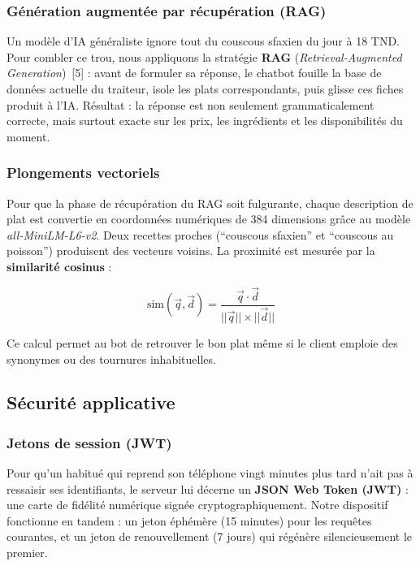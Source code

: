 \subsubsection{Génération augmentée par récupération (RAG)}

Un modèle d'IA généraliste ignore tout du couscous sfaxien du jour à 18 TND. Pour combler ce trou, nous appliquons la stratégie \textbf{RAG} (\textit{Retrieval-Augmented Generation})~[5] : avant de formuler sa réponse, le chatbot fouille la base de données actuelle du traiteur, isole les plats correspondants, puis glisse ces fiches produit à l'IA. Résultat : la réponse est non seulement grammaticalement correcte, mais surtout exacte sur les prix, les ingrédients et les disponibilités du moment.

\subsubsection{Plongements vectoriels}

Pour que la phase de récupération du RAG soit fulgurante, chaque description de plat est convertie en coordonnées numériques de 384 dimensions grâce au modèle \textit{all-MiniLM-L6-v2}. Deux recettes proches (``couscous sfaxien'' et ``couscous au poisson'') produisent des vecteurs voisins. La proximité est mesurée par la \textbf{similarité cosinus} :

\begin{equation}
    \text{sim}(\vec{q}, \vec{d}) = \frac{\vec{q} \cdot \vec{d}}{||\vec{q}|| \times ||\vec{d}||}
\end{equation}

Ce calcul permet au bot de retrouver le bon plat même si le client emploie des synonymes ou des tournures inhabituelles.

\subsection{Sécurité applicative}

\subsubsection{Jetons de session (JWT)}

Pour qu'un habitué qui reprend son téléphone vingt minutes plus tard n'ait pas à ressaisir ses identifiants, le serveur lui décerne un \textbf{JSON Web Token (JWT)} : une carte de fidélité numérique signée cryptographiquement. Notre dispositif fonctionne en tandem : un jeton éphémère (15 minutes) pour les requêtes courantes, et un jeton de renouvellement (7 jours) qui régénère silencieusement le premier.

